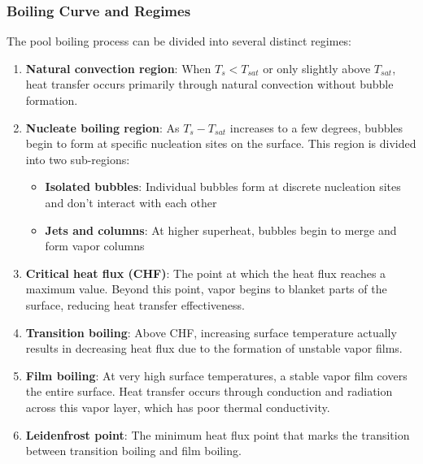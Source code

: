 \subsubsection*{Boiling Curve and Regimes}
The pool boiling process can be divided into several distinct regimes:

\begin{enumerate}
    \item \textbf{Natural convection region}: When $T_s < T_{sat}$ or only slightly above $T_{sat}$, heat transfer occurs primarily through natural convection without bubble formation.

    \item \textbf{Nucleate boiling region}: As $T_s - T_{sat}$ increases to a few degrees, bubbles begin to form at specific nucleation sites on the surface. This region is divided into two sub-regions:
       \begin{itemize}
           \item \textbf{Isolated bubbles}: Individual bubbles form at discrete nucleation sites and don't interact with each other
           \item \textbf{Jets and columns}: At higher superheat, bubbles begin to merge and form vapor columns
       \end{itemize}

    \item \textbf{Critical heat flux (CHF)}: The point at which the heat flux reaches a maximum value. Beyond this point, vapor begins to blanket parts of the surface, reducing heat transfer effectiveness.

    \item \textbf{Transition boiling}: Above CHF, increasing surface temperature actually results in decreasing heat flux due to the formation of unstable vapor films.

    \item \textbf{Film boiling}: At very high surface temperatures, a stable vapor film covers the entire surface. Heat transfer occurs through conduction and radiation across this vapor layer, which has poor thermal conductivity.

    \item \textbf{Leidenfrost point}: The minimum heat flux point that marks the transition between transition boiling and film boiling.
\end{enumerate}

